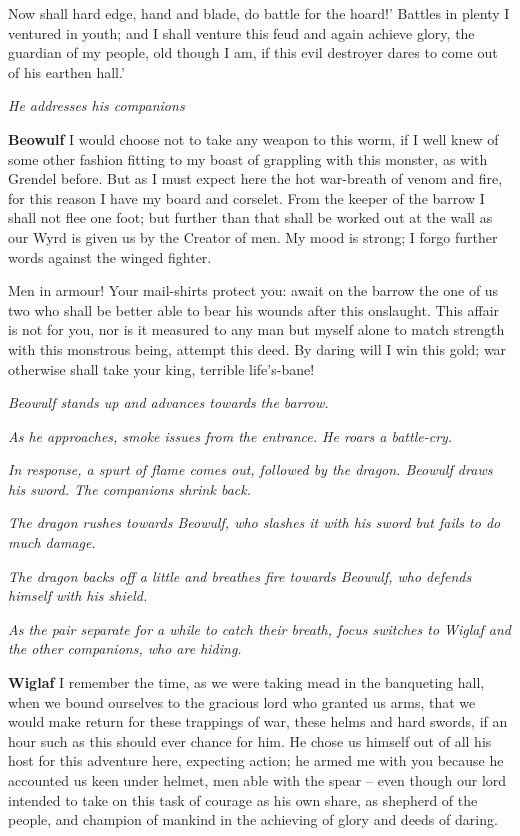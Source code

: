 \documentclass[a4paper]{article}
\begin{document}
{Now shall hard edge,
hand and blade, do battle for the hoard!’
Battles in plenty
I ventured in youth; and I shall venture this feud
and again achieve glory, the guardian of my people,
old though I am, if this evil destroyer
dares to come out of his earthen hall.’

\centerline{\textit{He addresses his companions}}

\textbf{Beowulf} I would choose not to take
any weapon to this worm, if I well knew
of some other fashion fitting to my boast
of grappling with this monster, as with Grendel before.
But as I must expect here the hot war-breath
of venom and fire, for this reason I have
my board and corselet. From the keeper of the barrow
I shall not flee one foot; but further than that
shall be worked out at the wall as our Wyrd is given us
by the Creator of men. My mood is strong;
I forgo further words against the winged fighter.

Men in armour! Your mail-shirts protect you:
await on the barrow the one of us two
who shall be better able to bear his wounds
after this onslaught. This affair is not for you,
nor is it measured to any man but myself alone
to match strength with this monstrous being,
attempt this deed. By daring will I
win this gold; war otherwise
shall take your king, terrible life’s-bane!

\centerline{\textit{Beowulf stands up and advances towards the barrow.}}
\centerline{\textit{As he approaches, smoke issues from the entrance. He roars a battle-cry.}}
\centerline{\textit{In response, a spurt of flame comes out, followed by the dragon. Beowulf draws his sword. The companions shrink back.}}

\centerline{\textit{The dragon rushes towards Beowulf, who slashes it with his sword but fails to do much damage.}}
\centerline{\textit{The dragon backs off a little and breathes fire towards Beowulf, who defends himself with his shield.}}
\centerline{\textit{As the pair separate for a while to catch their breath, focus switches to Wiglaf and the other companions, who are hiding.}}

\textbf{Wiglaf} I remember the time, as we were taking mead
in the banqueting hall, when we bound ourselves
to the gracious lord who granted us arms,
that we would make return for these trappings of war,
these helms and hard swords, if an hour such as this
should ever chance for him. He chose us himself
out of all his host for this adventure here,
expecting action; he armed me with you
because he accounted us keen under helmet,
men able with the spear – even though our lord
intended to take on this task of courage
as his own share, as shepherd of the people,
and champion of mankind in the achieving of glory
and deeds of daring.

}
\end{document}
